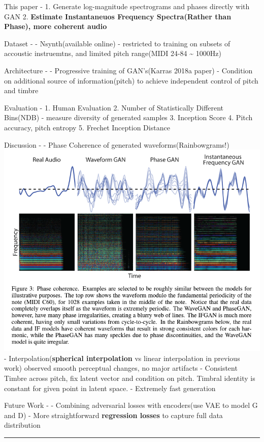 \documentclass[11pt]{article}
\makeatletter
\def\maxwidth{\ifdim\Gin@nat@width>\linewidth\linewidth
    \else\Gin@nat@width\fi}
\let\Oldincludegraphics\includegraphics
\renewcommand{\includegraphics}[1]{\Oldincludegraphics[width=.8\maxwidth]{#1}}
\makeatother
\begin{document}
    This paper - 1. Generate log-magnitude spectrograms and phases directly
with GAN 2. \textbf{Estimate Instantaneuos Frequency Spectra(Rather than
Phase), more coherent audio}

    Dataset - - Nsynth(available online) - restricted to training on subsets
of accoustic instruemtns, and limited pitch range(MIDI 24-84
\textasciitilde{} 1000Hz)

    Architecture - - Progressive training of GAN's(Karras 2018a paper) -
Condition on additional source of information(pitch) to achieve
independent control of pitch and timbre

    Evaluation - 1. Human Evaluation 2. Number of Statistically Different
Bins(NDB) - measure diversity of generated samples 3. Inception Score 4.
Pitch accuracy, pitch entropy 5. Frechet Inception Distance

    Discussion - - Phase Coherence of generated waveforms(Rainbowgrams!)
\includegraphics{fig_02.PNG} - Interpolation(\textbf{spherical
interpolation} vs linear interpolation in previous work) observed smooth
perceptual changes, no major artifacts - Consistent Timbre across pitch,
fix latent vector and condition on pitch. Timbral identity is constant
for given point in latent space. - Extremely fast generation

    Future Work - - Combining adversarial losses with encoders(use VAE to
model G and D) - More straightforward \textbf{regression losses} to
capture full data distribution

    \begin{center}\rule{0.5\linewidth}{\linethickness}\end{center}
\end{document}
